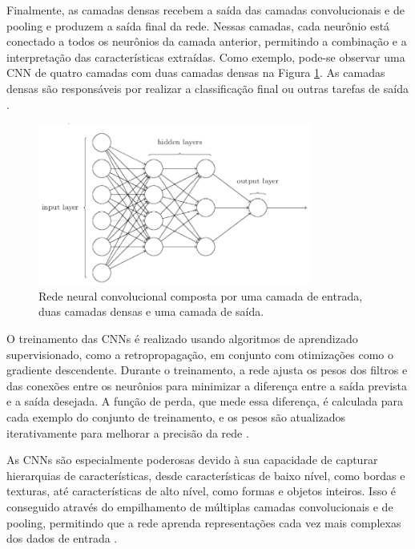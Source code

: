 Finalmente, as camadas densas recebem a saída das camadas convolucionais e de pooling e produzem a saída final da rede. Nessas camadas, cada neurônio está conectado a todos os neurônios da camada anterior, permitindo a combinação e a interpretação das características extraídas. Como exemplo, pode-se observar uma CNN de quatro camadas com duas camadas densas na Figura \ref{fig:hiddenlayers}. As camadas densas são responsáveis por realizar a classificação final ou outras tarefas de saída \cite{nielsen2015neural}.

\begin{figure}
    \centering   
    \includegraphics[width=0.8\textwidth]{fig/2hiddenlayers.png}
    \caption{Rede neural convolucional composta por uma camada de entrada, duas camadas densas e uma camada de saída.}
    \label{fig:hiddenlayers}
\end{figure}

O treinamento das CNNs é realizado usando algoritmos de aprendizado supervisionado, como a retropropagação, em conjunto com otimizações como o gradiente descendente. Durante o treinamento, a rede ajusta os pesos dos filtros e das conexões entre os neurônios para minimizar a diferença entre a saída prevista e a saída desejada. A função de perda, que mede essa diferença, é calculada para cada exemplo do conjunto de treinamento, e os pesos são atualizados iterativamente para melhorar a precisão da rede \cite{aggarwal2018neural}.

As CNNs são especialmente poderosas devido à sua capacidade de capturar hierarquias de características, desde características de baixo nível, como bordas e texturas, até características de alto nível, como formas e objetos inteiros. Isso é conseguido através do empilhamento de múltiplas camadas convolucionais e de pooling, permitindo que a rede aprenda representações cada vez mais complexas dos dados de entrada \cite{goodfellow2016deep}.


